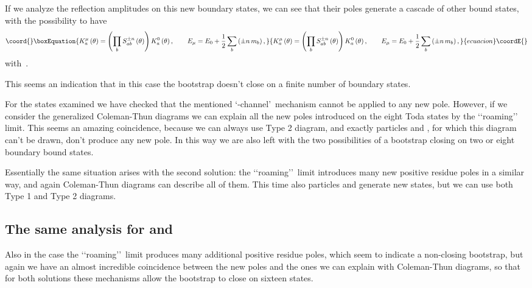 \documentclass[a4paper,12pt]{report}
\begin{document}
If we analyze the reflection amplitudes on this new boundary states, we can see that their poles generate a
cascade of other bound states, with the possibility to have
\begin{equation}\coord{}\boxEquation{\label{noncolour}
K_{a}^{\mu}\left(\theta\right)=\left(\prod_{b}S_{ab}^{\pm
n}\left(\theta\right)\right)K_{a}^{0}\left(\theta\right), \qquad E_{\mu}=E_{0}+\frac{1}{2}\sum_{b}\left(\pm
n\,m_{b}\right),
}{K_{a}^{\mu}\left(\theta\right)=\left(\prod_{b}S_{ab}^{\pm
n}\left(\theta\right)\right)K_{a}^{0}\left(\theta\right), \qquad E_{\mu}=E_{0}+\frac{1}{2}\sum_{b}\left(\pm
n\,m_{b}\right),
}{ecuacion}\coordE{}\end{equation}
with \coordHE{}\,.

This seems an indication that in this case the bootstrap doesn't close on a finite number of boundary states.

For the states examined we have checked that the mentioned \lq{}\coordHE{}-channel\rq \, mechanism cannot be applied to any
new pole. However, if we consider the generalized Coleman-Thun diagrams we can explain all the new poles
introduced on the eight Toda states by the \lq\lq roaming\rq\rq \, limit. This seems an amazing coincidence,
because we can always use Type 2 diagram, and exactly particles \coordHE{} and \coordHE{}, for which this diagram can't be
drawn, don't produce any new pole. In this way we are also left with the two possibilities of a bootstrap closing
on two or eight boundary bound states.

Essentially the same situation arises with the second solution: the \lq\lq roaming\rq\rq \, limit introduces many
new positive residue poles in a similar way, and again Coleman-Thun diagrams can describe all of them. This time
also particles \coordHE{} and \coordHE{} generate new states, but we can use both Type 1 and Type 2 diagrams.

\subsection{The same analysis for \coordHE{} and \coordHE{}}

Also in the \coordHE{} case the \lq\lq roaming\rq\rq \, limit produces many additional positive residue poles, which
seem to indicate a non-closing bootstrap, but again we have an almost incredible coincidence between the new
poles and the ones we can explain with Coleman-Thun diagrams, so that for both solutions these mechanisms allow
the bootstrap to close on sixteen states.
\end{document}
